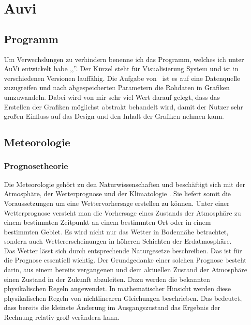 \section{Auvi}

\subsection{Programm} %
Um Verwechslungen zu verhindern benenne ich das Programm, welches ich unter AuVi entwickelt habe ,,\vs ''. Der Kürzel steht für Visualisierung System und ist in verschiedenen Versionen lauffähig.
Die Aufgabe von \vs\ ist es auf eine Datenquelle zuzugreifen und nach abgespeicherten Parametern die Rohdaten in Grafiken umzuwandeln.
Dabei wird von mir sehr viel Wert darauf gelegt, dass das Erstellen der Grafiken möglichst abstrakt behandelt wird, damit der Nutzer sehr großen Einfluss auf das Design und den Inhalt der Grafiken nehmen kann.

\subsection{Meteorologie} %

\subsubsection{Prognosetheorie} %
Die Meteorologie gehört zu den Naturwissenschaften und beschäftigt sich mit der Atmosphäre, der Wetterprognose und der Klimatologie \cite{meteorologie}.
Sie liefert somit die Voraussetzungen um eine Wettervorhersage erstellen zu können.
Unter einer Wetterprognose versteht man die Vorhersage eines Zustands der Atmosphäre zu einem bestimmten Zeitpunkt an einem bestimmten Ort oder in einem bestimmten Gebiet.
Es wird nicht nur das Wetter in Bodennähe betrachtet, sondern auch Wettererscheinungen in höheren Schichten der Erdatmosphäre.
\\
Das Wetter lässt sich durch entsprechende Naturgesetze beschreiben. Das ist für die Prognose essentiell wichtig.
Der Grundgedanke einer solchen Prognose besteht darin, aus einem bereits vergangenen und dem aktuellen Zustand der Atmosphäre einen Zustand in der Zukunft abzuleiten.
Dazu werden die bekannten physikalischen Regeln angewendet.
In mathematischer Hinsicht werden diese physikalischen Regeln von nichtlinearen Gleichungen beschrieben.
Das bedeutet, dass bereits die kleinste Änderung im Ausgangszustand das Ergebnis der Rechnung relativ groß verändern kann. %


